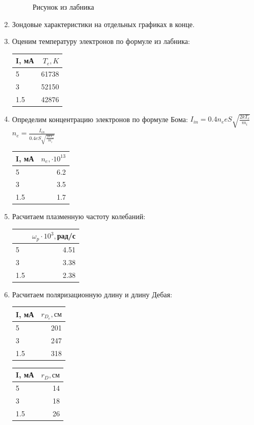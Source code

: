 \documentclass[12pt,a4paper]{article}
\begin{document}
\begin{enumerate}
\begin{figure}
    \caption{Рисунок из лабника}
  \end{figure}
  \item Зондовые характеристики на отдельных графиках в конце.
  \item Оценим температуру электронов по формуле из лабника:
  \begin{tabular}{l|r}
    I, мА & $T_e, K$\\
    \midrule
    5   &  61738 \\
    3   &  52150 \\
    1.5 &  42876 \\
    \end{tabular}
  \item Определим концентрацию электронов по формуле Бома:
  $I_{in} = 0.4n_eeS\sqrt{\frac{2kT_e}{m_i}}$\\
  $n_e = \frac{I_{in}}{0.4eS\sqrt{\frac{2kT_e}{m_i}}}$
  \begin{tabular}{l|r}
    I, мА & $n_e,\cdot 10^{13}$ \\
    \midrule
    5   &  6.2 \\
    3   &  3.5 \\
    1.5 &  1.7 \\
  \end{tabular}
  \item Расчитаем плазменную частоту колебаний:
  \begin{tabular}{l|r}
     & $\omega_p \cdot10^3,$рад/с \\
    \midrule
    5   &  4.51 \\
    3   &  3.38 \\
    1.5 &  2.38 \\
    \end{tabular}
  \item Расчитаем поляризационную длину и длину Дебая:
  \begin{tabular}{lr}
    I, мА & $r_{D_e}, см$ \\
    \midrule
    5 &  201 \\
    3 &  247 \\
    1.5 &  318 \\
    \end{tabular}
     
     \begin{tabular}{lr}
    I, мА & $r_{D}, см$ \\
    \midrule
    5 &  14 \\
    3 &  18 \\
    1.5 &  26 \\
    \end{tabular}
    
\end{enumerate}
\end{document}
